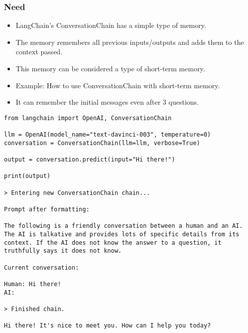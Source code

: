 \begin{frame}[fragile]
\frametitle{Need}

\begin{itemize}
    \item LangChain's ConversationChain has a simple type of memory.
    \item The memory remembers all previous inputs/outputs and adds them to the context passed.
    \item This memory can be considered a type of short-term memory.
    \item Example: How to use ConversationChain with short-term memory.
    \item It can remember the initial messages even after 3 questions.
\end{itemize}

\begin{lstlisting}
from langchain import OpenAI, ConversationChain

llm = OpenAI(model_name="text-davinci-003", temperature=0)
conversation = ConversationChain(llm=llm, verbose=True)

output = conversation.predict(input="Hi there!")

print(output)

> Entering new ConversationChain chain...

Prompt after formatting:

The following is a friendly conversation between a human and an AI. The AI is talkative and provides lots of specific details from its context. If the AI does not know the answer to a question, it truthfully says it does not know.

Current conversation:

Human: Hi there!
AI:

> Finished chain.

Hi there! It's nice to meet you. How can I help you today?
\end{lstlisting}

\end{frame}

